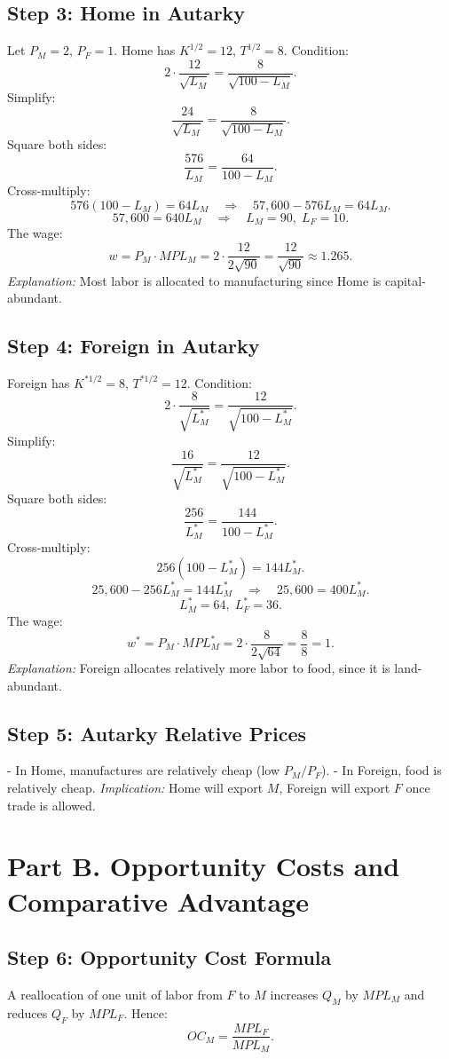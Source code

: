 \documentclass[12pt]{article}
\begin{document}
\subsection*{Step 3: Home in Autarky}
Let $P_M=2$, $P_F=1$. Home has $K^{1/2}=12$, $T^{1/2}=8$.  
Condition:
\[
2 \cdot \frac{12}{\sqrt{L_M}} = \frac{8}{\sqrt{100-L_M}}.
\]
Simplify:
\[
\frac{24}{\sqrt{L_M}} = \frac{8}{\sqrt{100-L_M}}.
\]
Square both sides:
\[
\frac{576}{L_M} = \frac{64}{100-L_M}.
\]
Cross-multiply:
\[
576(100-L_M) = 64 L_M \quad \Rightarrow \quad 57,600 - 576L_M = 64L_M.
\]
\[
57,600 = 640L_M \quad \Rightarrow \quad L_M = 90,\; L_F = 10.
\]
The wage:
\[
w = P_M \cdot MPL_M = 2 \cdot \frac{12}{2\sqrt{90}} = \frac{12}{\sqrt{90}} \approx 1.265.
\]
\textit{Explanation:} Most labor is allocated to manufacturing since Home is capital-abundant.

\subsection*{Step 4: Foreign in Autarky}
Foreign has $K^{*1/2}=8$, $T^{*1/2}=12$.  
Condition:
\[
2 \cdot \frac{8}{\sqrt{L_M^{*}}} = \frac{12}{\sqrt{100-L_M^{*}}}.
\]
Simplify:
\[
\frac{16}{\sqrt{L_M^{*}}} = \frac{12}{\sqrt{100-L_M^{*}}}.
\]
Square both sides:
\[
\frac{256}{L_M^{*}} = \frac{144}{100-L_M^{*}}.
\]
Cross-multiply:
\[
256(100-L_M^{*}) = 144 L_M^{*}.
\]
\[
25,600 - 256 L_M^{*} = 144 L_M^{*} \quad \Rightarrow \quad 25,600 = 400 L_M^{*}.
\]
\[
L_M^{*} = 64,\; L_F^{*} = 36.
\]
The wage:
\[
w^{*} = P_M \cdot MPL_M^{*} = 2 \cdot \frac{8}{2\sqrt{64}} = \frac{8}{8} = 1.
\]
\textit{Explanation:} Foreign allocates relatively more labor to food, since it is land-abundant.

\subsection*{Step 5: Autarky Relative Prices}
- In Home, manufactures are relatively cheap (low $P_M/P_F$).  
- In Foreign, food is relatively cheap.  
\textit{Implication:} Home will export $M$, Foreign will export $F$ once trade is allowed.

\bigskip

\section*{Part B. Opportunity Costs and Comparative Advantage}

\subsection*{Step 6: Opportunity Cost Formula}
A reallocation of one unit of labor from $F$ to $M$ increases $Q_M$ by $MPL_M$ and reduces $Q_F$ by $MPL_F$.  
Hence:
\[
OC_M = \frac{MPL_F}{MPL_M}.
\]
\end{document}
